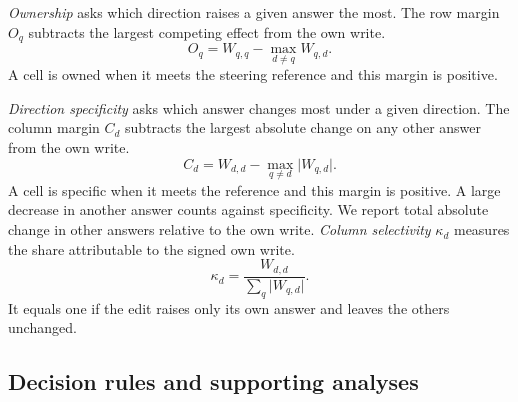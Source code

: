 \emph{Ownership} asks which direction raises a given answer the most. The row margin $O_q$ subtracts the largest competing effect from the own write.
\begin{equation}
O_q=W_{q,q}-\max_{d\ne q}W_{q,d}.
\label{eq:margin}
\end{equation}
A cell is owned when it meets the steering reference and this margin is positive.

\emph{Direction specificity} asks which answer changes most under a given direction. The column margin $C_d$ subtracts the largest absolute change on any other answer from the own write.
\begin{equation}
C_d=W_{d,d}-\max_{q\ne d}\lvert W_{q,d}\rvert.
\label{eq:column-margin}
\end{equation}
A cell is specific when it meets the reference and this margin is positive. A large decrease in another answer counts against specificity. We report total absolute change in other answers relative to the own write. \emph{Column selectivity} $\kappa_d$ measures the share attributable to the signed own write.
\begin{equation}
\kappa_d=\frac{W_{d,d}}{\sum_q\lvert W_{q,d}\rvert}.
\label{eq:column-selectivity}
\end{equation}
It equals one if the edit raises only its own answer and leaves the others unchanged.

\subsection{Decision rules and supporting analyses}
\label{sec:grades}

\begin{table}[pos=t]
\centering
\caption{\textbf{RAW grades.} Reading and answering use calibration data. Intervention criteria use the test cohort.}
\label{tab:grades}
\end{table}


